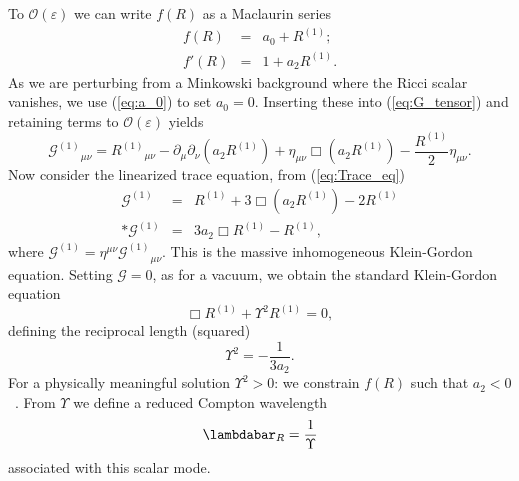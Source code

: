 \documentclass[aps,prd,amsfonts,amssymb,amsmath,nofootinbib,reprint,showpacs]{revtex4-1}
\newcommand{\eqnref}[1]{(\ref{eq:#1})}
\newcommand{\recip}[1]{\ensuremath{\frac{1}{#1}}}
\newcommand{\order}[1]{\ensuremath{\mathcal{O}({#1})}}
\begin{document}
To $\order{\varepsilon}$ we can write $f(R)$ as a Maclaurin series
\begin{eqnarray}
f(R) & = & a_0 + R^{(1)}; \\
f'(R) & = & 1 + a_2 R^{(1)}.
\end{eqnarray}
As we are perturbing from a Minkowski background where the Ricci scalar vanishes, we use \eqnref{a_0} to set $a_0 = 0$. Inserting these into \eqnref{G_tensor} and retaining terms to $\order{\varepsilon}$ yields
\begin{equation}
{\mathcal{G}^{(1)}}_{\mu\nu} = {R^{(1)}}_{\mu\nu} - \partial_\mu\partial_\nu(a_2 R^{(1)}) + \eta_{\mu\nu}\Box(a_2 R^{(1)}) - \frac{R^{(1)}}{2}\eta_{\mu\nu}.
\label{eq:Field}
\end{equation}
Now consider the linearized trace equation, from \eqnref{Trace_eq}
\begin{eqnarray}
\mathcal{G}^{(1)} & = & R^{(1)} + 3 \Box(a_2 R^{(1)}) - 2 R^{(1)} \nonumber \\*
\mathcal{G}^{(1)} & = & 3a_2 \Box R^{(1)} - R^{(1)},
\label{eq:Box_R}
\end{eqnarray}
where $\mathcal{G}^{(1)} = \eta^{\mu\nu}{\mathcal{G}^{(1)}}_{\mu\nu}$. This is the massive inhomogeneous Klein-Gordon equation. Setting $\mathcal{G} = 0$, as for a vacuum, we obtain the standard Klein-Gordon equation
\begin{equation}
\Box R^{(1)} + \Upsilon^2 R^{(1)} = 0,
\end{equation}
defining the reciprocal length (squared)
\begin{equation}
\Upsilon^2 = -\recip{3a_2}.
\end{equation}
For a physically meaningful solution $\Upsilon^2 > 0$: we constrain $f(R)$ such that $a_2 < 0$~\cite{Schmidt1986, Teyssandier1990, Olmo2005c, Corda2007}. From $\Upsilon$ we define a reduced Compton wavelength
\begin{equation}
\lambdabar_R = \recip{\Upsilon}
\end{equation}
associated with this scalar mode.
\end{document}
